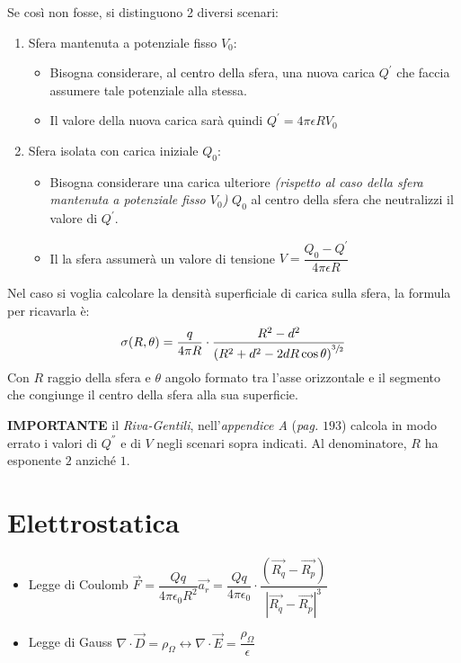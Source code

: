 \documentclass{article}
\begin{document}
Se così non fosse, si distinguono 2 diversi scenari:
\begin{enumerate}
	\item Sfera mantenuta a potenziale fisso \(V_0\):
		\begin{itemize}
			\item Bisogna considerare, al centro della sfera, una nuova carica \(Q^{'}\) che faccia assumere tale potenziale alla stessa.
			\item Il valore della nuova carica sarà quindi \(Q^{'} = 4 \pi \epsilon R V_0\)
		\end{itemize}
		
	\item Sfera isolata con carica iniziale \(Q_0\):
	\begin{itemize}
		\item Bisogna considerare una carica ulteriore \textit{(rispetto al caso della sfera mantenuta a potenziale fisso \(V_0\))} \(Q_0\) al centro della sfera che neutralizzi il valore di \(Q^{'}\).
		\item Il la sfera assumerà un valore di tensione \(V = \dfrac{Q_0 - Q^{'}}{4 \pi \epsilon R} \)
	\end{itemize}	 
\end{enumerate}

Nel caso si voglia calcolare la densità superficiale di carica sulla sfera, la formula per ricavarla è: 
\[
	\sigma(R, \theta) = \dfrac{q}{4 \pi R} \cdot \dfrac{R^2 - d^2}{\left(R^2 + d^2 - 2dR\cos\theta\right) ^ {\sfrac{3}{2}}}
\]
Con \(R\) raggio della sfera e \(\theta\) angolo formato tra l'asse orizzontale e il segmento che congiunge il centro della sfera alla sua superficie.

\bigskip

\textbf{IMPORTANTE} il \textit{Riva-Gentili}, nell'\textit{appendice A} (\textit{pag.} \(193\)) calcola in modo errato i valori di \(Q^{''}\) e di \(V\) negli scenari sopra indicati. Al denominatore, \(R\) ha esponente \(2\) anziché \(1\).


\newpage

\section{Elettrostatica}
\begin{itemize}
	\item Legge di Coulomb \( \vec{F} = \dfrac{Qq}{4 \pi \epsilon_0 R^2} \vec{a_r} = \dfrac{Qq}{4 \pi \epsilon_0} \cdot \dfrac{(\vec{R_q} - \vec{R_p})}{| \vec{R_q} - \vec{R_p} | ^3 } \)
	\item Legge di Gauss \( \nabla \cdot \vec{D} = \rho_\Omega \leftrightarrow \nabla \cdot \vec{E} = \dfrac{\rho_\Omega}{\epsilon} \)
\end{itemize}
\end{document}
